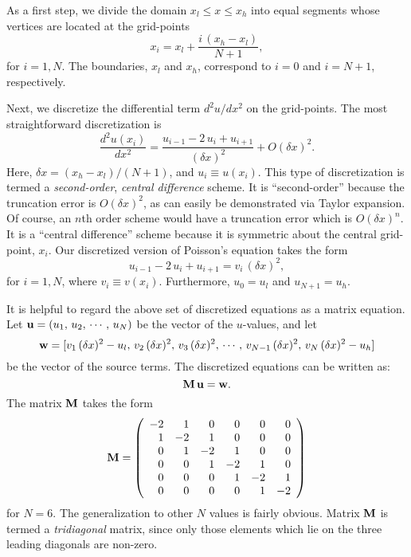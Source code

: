 	As a first step, we divide the domain $x_l\leq x\leq x_h$ into  equal
segments whose vertices are located at the grid-points
\begin{equation}\label{e57}
x_i = x_l + \frac{i\,(x_h-x_l)}{N+1},
\end{equation}
for $i=1,N$. The boundaries, $x_l$ and $x_h$,  correspond to $i=0$ and $i=N+1$,
respectively.

Next, we  discretize the differential term $d^2u/dx^2$ on the grid-points. The most
straightforward discretization is
\begin{equation}\label{e58}
\frac{d^2u(x_i)}{dx^2} = \frac{u_{i-1} - 2\,u_i+u_{i+1}}{(\delta x)^2} + O(\delta x)^2.
\end{equation}
Here, $\delta x = (x_h-x_l)/(N+1)$, and $u_i \equiv u(x_i)$. This type
of discretization is termed a {\em second-order}, {\em central difference} scheme. 
It is
``second-order'' because the truncation error is $O(\delta x)^2$, as can
 easily be demonstrated via Taylor expansion. Of course, an $n$th order scheme
would have a truncation error which is $O(\delta x)^n$.
It is a ``central difference'' scheme because it is symmetric about the central
grid-point, $x_i$. 
Our discretized version of Poisson's equation takes the form
\begin{equation}
u_{i-1} -2\,u_i + u_{i+1} = v_i\,(\delta x)^2,
\end{equation}
for $i=1,N$, where $v_i\equiv v(x_i)$. Furthermore, $u_0=u_l$ and $u_{N+1} = u_h$. 

It is helpful to regard the above set of discretized equations as a matrix equation.
Let ${\bf u} = (u_1,\, u_2,\, \cdots,\, u_N)$ be the vector of the $u$-values,
and let 
\begin{equation}\label{e510}
{\bf w} = [v_1\,(\delta x)^2 - u_l,\, v_2\,(\delta x)^2,\, v_3\,(\delta x)^2,\,\cdots,\, v_{N-1}\, (\delta x)^2,\,
v_N\,(\delta x)^2 - u_h]
\end{equation}
 be the vector of the source terms. The discretized equations can be written
as:
\begin{equation}\label{e511}
{\bf M}\,{\bf u} = {\bf w}.
\end{equation}
The matrix ${\bf M}$ takes the form
\begin{equation}
{\bf M} = \left(\begin{array}{rrrrrr}
-2 &  1 & 0  &  0 &  0 &  0 \\
 1 & -2 & 1  &  0 &  0 &  0 \\
 0 &  1 & -2 &  1 &  0 &  0 \\
 0 &  0 &  1 & -2 &  1 &  0 \\
 0 &  0 &  0 &  1 & -2 &  1 \\
 0 &  0 &  0 &  0 &  1 & -2 \\ 
\end{array}
 \right)
\end{equation}
for $N=6$. The generalization to other $N$ values is fairly obvious.
Matrix ${\bf M}$ is termed a {\em tridiagonal} matrix, since only those elements which lie on
the three leading diagonals are non-zero.

